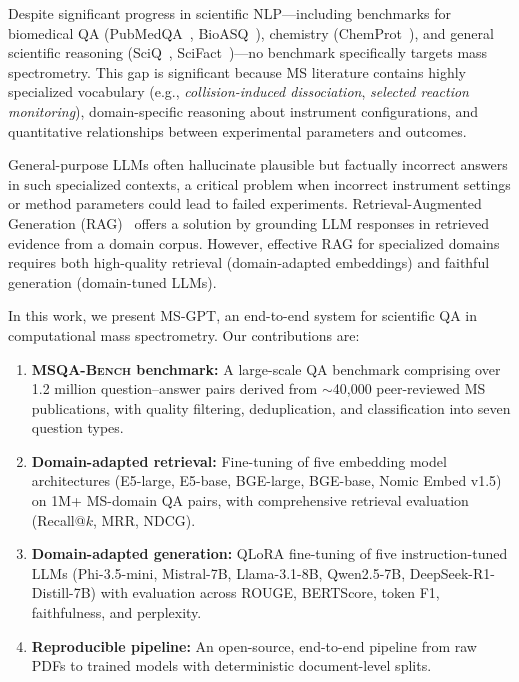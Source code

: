 \documentclass[11pt]{article}
\newcommand{\msgpt}{\textsc{MS-GPT}}
\newcommand{\msqa}{\textsc{MSQA-Bench}}
\begin{document}
Despite significant progress in scientific NLP---including benchmarks for
biomedical QA
(PubMedQA~\citep{jin2019pubmedqa}, BioASQ~\citep{tsatsaronis2015overview}),
chemistry (ChemProt~\citep{taboureau2011chemprot}), and general scientific
reasoning (SciQ~\citep{welbl2017crowdsourcing},
SciFact~\citep{wadden2020fact})---no benchmark specifically targets mass
spectrometry. This gap is significant because MS literature contains highly
specialized vocabulary (e.g., \textit{collision-induced dissociation},
\textit{selected reaction monitoring}), domain-specific reasoning about
instrument configurations, and quantitative relationships between experimental
parameters and outcomes.

General-purpose LLMs often hallucinate plausible but factually incorrect
answers in such specialized contexts, a critical problem when incorrect
instrument settings or method parameters could lead to failed experiments.
Retrieval-Augmented Generation (RAG)~\citep{lewis2020rag} offers a solution by
grounding LLM responses in retrieved evidence from a domain corpus. However,
effective RAG for specialized domains requires both high-quality retrieval
(domain-adapted embeddings) and faithful generation (domain-tuned LLMs).

In this work, we present \msgpt{}, an end-to-end system for scientific QA in
computational mass spectrometry. Our contributions are:

\begin{enumerate}[leftmargin=*,itemsep=2pt]
    \item \textbf{\msqa{} benchmark:} A large-scale QA benchmark comprising
    over 1.2 million question--answer pairs derived from $\sim$40,000
    peer-reviewed MS publications, with quality filtering, deduplication, and
    classification into seven question types.

    \item \textbf{Domain-adapted retrieval:} Fine-tuning of five embedding
    model architectures (E5-large, E5-base, BGE-large, BGE-base, Nomic
    Embed v1.5) on 1M+ MS-domain QA pairs, with comprehensive retrieval
    evaluation (Recall@$k$, MRR, NDCG).

    \item \textbf{Domain-adapted generation:} QLoRA fine-tuning of five
    instruction-tuned LLMs (Phi-3.5-mini, Mistral-7B, Llama-3.1-8B,
    Qwen2.5-7B, DeepSeek-R1-Distill-7B) with evaluation across ROUGE,
    BERTScore, token F1, faithfulness, and perplexity.

    \item \textbf{Reproducible pipeline:} An open-source, end-to-end pipeline
    from raw PDFs to trained models with deterministic document-level splits.
\end{enumerate}
\end{document}
